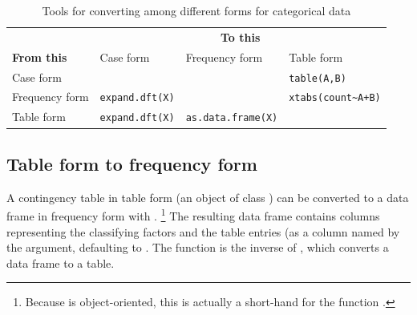 \documentclass[11pt]{book}\usepackage[]{graphicx}\usepackage[]{color}
\begin{document}
\begin{table}[htb]
 \caption{Tools for converting among different forms for categorical data}\label{tab:convert}
 \newsavebox{\adfxtabs}
 \begin{center}
   \begin{tabular}{l|lll}
  \hline
                 & \multicolumn{3}{c}{\textbf{To this}} \\
	\textbf{From this}      &     Case form         & Frequency form             &  Table form \\
	\hline
  Case form      &                        & \usebox{\adfxtabs}        &  \verb|table(A,B)|  \\ 
	Frequency form &  \verb|expand.dft(X)|  &                           & \verb|xtabs(count~A+B)|\\
	Table form     &  \verb|expand.dft(X)|  & \verb|as.data.frame(X)|   &       \\
	\hline
   \end{tabular}
 \end{center}
\end{table}

\subsection{Table form to frequency form}
A contingency table in table form (an object of class ) can be converted
to a data frame in frequency form with .%
\footnote{
Because \R is object-oriented, this is actually a short-hand for
the function .
}  
The resulting
data frame contains columns
representing the classifying factors and the table entries (as a column named by
the  argument, defaulting to .  The function
 is the inverse of , which converts a data frame to a table.
\end{document}
